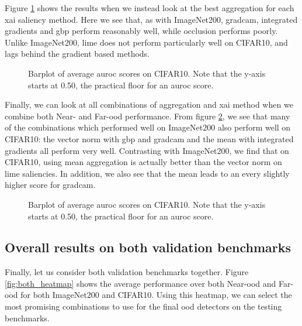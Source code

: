 \documentclass[UKenglish]{uiomasterthesis} %
\theoremstyle{definition}
\begin{document}
Figure \ref{fig:cifar10_all_generators_barplot} shows the results when we instead look at the best aggregation for each \ac{xai} saliency method. Here we see that, as with ImageNet200, \ac{gradcam}, integrated gradients and \ac{gbp} perform reasonably well, while occlusion performs poorly. Unlike ImageNet200, \ac{lime} does not perform particularly well on CIFAR10, and lags behind the gradient based methods.

\begin{figure}[H]
    \begin{center}
        
    \end{center}
    \caption[Average scores]{Barplot of average \ac{auroc} scores on CIFAR10. Note that the y-axis starts at 0.50, the practical floor for an \ac{auroc} score.}
    \label{fig:cifar10_all_generators_barplot}
\end{figure}

Finally, we can look at all combinations of aggregation and \ac{xai} method when we combine both Near- and Far-\ac{ood} performance. From figure \ref{fig:cifar10_heatmap}, we see that many of the combinations which performed well on ImageNet200 also perform well on CIFAR10: the vector norm with \ac{gbp} and \ac{gradcam} and the mean with integrated gradients all perform very well. Contrasting with ImageNet200, we find that on CIFAR10, using mean aggregation is actually better than the vector norm on \ac{lime} saliencies. In addition, we also see that the mean leads to an every slightly higher score for \ac{gradcam}.

\begin{figure}[H]
    \begin{center}
        
    \end{center}
    \caption[Average scores]{Barplot of average \ac{auroc} scores on CIFAR10. Note that the y-axis starts at 0.50, the practical floor for an \ac{auroc} score.}
    \label{fig:cifar10_heatmap}
\end{figure}


\subsection{Overall results on both validation benchmarks}

Finally, let us consider both validation benchmarks together. Figure \ref{fig:both_heatmap} shows the average performance over both Near-\ac{ood} and Far-\ac{ood} for both ImageNet200 and CIFAR10. Using this heatmap, we can select the most promising combinations to use for the final \ac{ood} detectors on the testing benchmarks.
\end{document}
